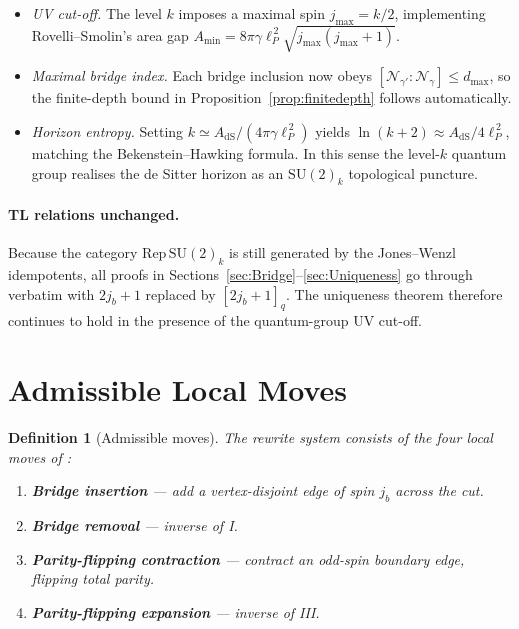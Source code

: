 \documentclass[11pt]{article}
\newtheorem{definition}{Definition}[section]
\begin{document}
\begin{itemize}
  \item \emph{UV cut-off.}
    The level $k$ imposes a maximal spin $j_{\max}=k/2$, implementing
    Rovelli–Smolin’s area gap
    $A_{\min}=8\pi\gamma\ell_P^{\,2}\sqrt{j_{\max}(j_{\max}+1)}$.
  \item \emph{Maximal bridge index.}
    Each bridge inclusion now obeys
    $[\mathcal N_{\gamma'}:\mathcal N_{\gamma}]\le d_{\max}$,
    so the finite-depth bound in
    Proposition~\ref{prop:finitedepth} follows automatically.
  \item \emph{Horizon entropy.}
    Setting $k\simeq A_{\text{dS}}/(4\pi\gamma\ell_P^{\,2})$ yields
    $\ln(k+2)\approx A_{\text{dS}}/4\ell_P^{\,2}$,
    matching the Bekenstein–Hawking formula.
    In this sense the level-$k$ quantum group realises the de Sitter
    horizon as an $\mathrm{SU}(2)_k$ topological puncture.
\end{itemize}

\paragraph{TL relations unchanged.}
Because the category $\mathrm{Rep}\,\mathrm{SU}(2)_k$ is still generated
by the Jones–Wenzl idempotents,
all proofs in Sections~\ref{sec:Bridge}–\ref{sec:Uniqueness} go through
verbatim with $2j_b+1$ replaced by $[2j_b+1]_q$.
The uniqueness theorem therefore continues to hold in the presence of the
quantum-group UV cut-off.

\section{Admissible Local Moves}

\begin{definition}[Admissible moves]\label{def:moves}
  The rewrite system consists of the four local moves of \cite{EntropyMono}:
  \begin{enumerate}
    \item[\textbf{I.}] \textbf{Bridge insertion} — add a vertex-disjoint edge of spin
      $j_b$ across the cut.
    \item[\textbf{II.}] \textbf{Bridge removal} — inverse of I.
    \item[\textbf{III.}] \textbf{Parity-flipping contraction} — contract an odd-spin
      boundary edge, flipping total parity.
    \item[\textbf{IV.}] \textbf{Parity-flipping expansion} — inverse of III.
  \end{enumerate}
\end{definition}
\end{document}
